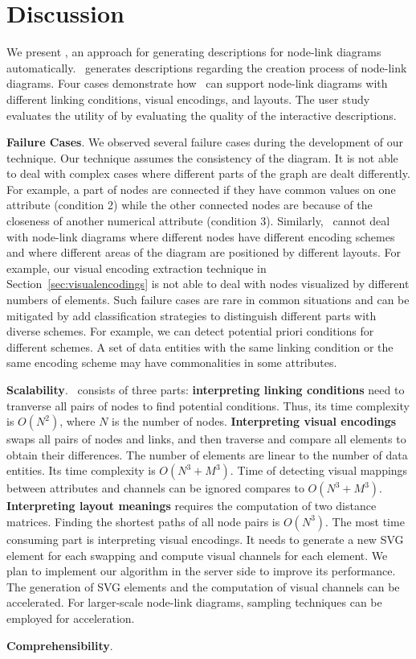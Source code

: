 \section{Discussion}
We present \ApproachName, an approach for generating descriptions for node-link diagrams automatically.
\ApproachName~generates descriptions regarding the creation process of node-link diagrams.
Four cases demonstrate how \ApproachName~can support node-link diagrams with different linking conditions, visual encodings, and layouts.
The user study evaluates the utility of \ApproachName by evaluating the quality of the interactive descriptions.


\textbf{Failure Cases}.
We observed several failure cases during the development of our technique.
Our technique assumes the consistency of the diagram.
It is not able to deal with complex cases where different parts of the graph are dealt differently.
For example, a part of nodes are connected if they have common values on one attribute (condition 2) while the other connected nodes are because of the closeness of another numerical attribute (condition 3).
Similarly, \ApproachName~cannot deal with node-link diagrams where different nodes have different encoding schemes and where different areas of the diagram are positioned by different layouts.
For example, our visual encoding extraction technique in Section~\ref{sec:visualencodings} is not able to deal with nodes visualized by different numbers of elements.
Such failure cases are rare in common situations and can be mitigated by add classification strategies to distinguish different parts with diverse schemes.
For example, we can detect potential priori conditions for different schemes.
A set of data entities with the same linking condition or the same encoding scheme may have commonalities in some attributes.

\textbf{Scalability}.
\ApproachName~consists of three parts:
\textbf{interpreting linking conditions} need to tranverse all pairs of nodes to find potential conditions.
Thus, its time complexity is $O(N^2)$, where $N$ is the number of nodes.
\textbf{Interpreting visual encodings} swaps all pairs of nodes and links, and then traverse and compare all elements to obtain their differences.
The number of elements are linear to the number of data entities.
Its time complexity is $O(N^3 + M^3)$.
Time of detecting visual mappings between attributes and channels can be ignored compares to $O(N^3 + M^3)$.
\textbf{Interpreting layout meanings} requires the computation of two distance matrices.
Finding the shortest paths of all node pairs is $O(N^3)$.
The most time consuming part is interpreting visual encodings.
It needs to generate a new SVG element for each swapping and compute visual channels for each element.
We plan to implement our algorithm in the server side to improve its performance.
The generation of SVG elements and the computation of visual channels can be accelerated.
For larger-scale node-link diagrams, sampling techniques can be employed for acceleration.

\textbf{Comprehensibility}.
